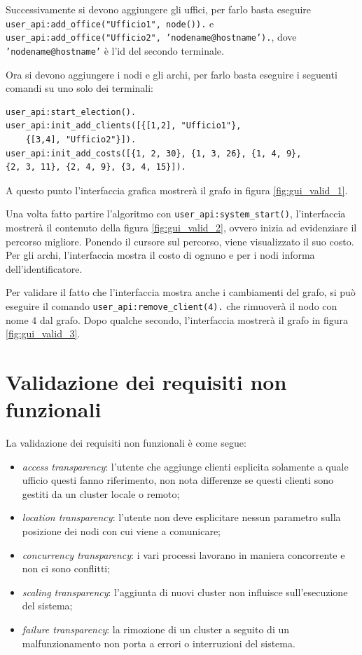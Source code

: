 Successivamente si devono aggiungere gli uffici, per farlo basta eseguire \texttt{user\_api:add\_office("Ufficio1", node()).}
e \texttt{user\_api:add\_office("Ufficio2", 'nodename@hostname').}, dove \texttt{'nodename@hostname'} è l'id del secondo terminale.

Ora si devono aggiungere i nodi e gli archi, per farlo basta eseguire i seguenti comandi su uno solo dei terminali:
\begin{verbatim}
user_api:start_election().
user_api:init_add_clients([{[1,2], "Ufficio1"},
    {[3,4], "Ufficio2"}]).
user_api:init_add_costs([{1, 2, 30}, {1, 3, 26}, {1, 4, 9}, 
{2, 3, 11}, {2, 4, 9}, {3, 4, 15}]).
\end{verbatim}

A questo punto l'interfaccia grafica mostrerà il grafo in figura \ref{fig:gui_valid_1}.

Una volta fatto partire l'algoritmo con \texttt{user\_api:system\_start()}, l'interfaccia
mostrerà il contenuto della figura \ref{fig:gui_valid_2}, ovvero inizia ad evidenziare
il percorso migliore. Ponendo il cursore sul percorso, viene visualizzato il suo costo. 
Per gli archi, l'interfaccia mostra il costo di ognuno e per i nodi informa dell'identificatore. 

Per validare il fatto che l'interfaccia mostra anche i cambiamenti del grafo, si può eseguire
il comando \texttt{user\_api:remove\_client(4).} che rimuoverà il nodo con nome 4 dal grafo. 
Dopo qualche secondo, l'interfaccia mostrerà il grafo in figura \ref{fig:gui_valid_3}.

\section{Validazione dei requisiti non funzionali}
La validazione dei requisiti non funzionali è come segue:
\begin{itemize}
    \item \textit{access transparency}: l'utente che aggiunge clienti esplicita solamente a quale
    ufficio questi fanno riferimento, non nota differenze se questi clienti sono gestiti da un cluster
    locale o remoto;
    \item \textit{location transparency}: l'utente non deve esplicitare nessun parametro sulla posizione
    dei nodi con cui viene a comunicare;
    \item \textit{concurrency transparency}: i vari processi lavorano in maniera concorrente e non ci sono
    conflitti;
    \item \textit{scaling transparency}: l'aggiunta di nuovi cluster non influisce sull'esecuzione del sistema;
    \item \textit{failure transparency}: la rimozione di un cluster a seguito di un malfunzionamento
    non porta a errori o interruzioni del sistema.
\end{itemize}

